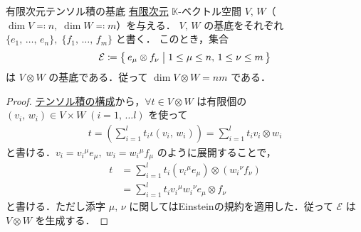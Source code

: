 \documentclass[rep_main]{subfiles}
\begin{document}
\begin{myprop}[label=prop:basis-tensor]{有限次元テンソル積の基底}
	\underline{有限次元} $\mathbb{K}$-ベクトル空間 $V,\, W$（$\dim V \eqqcolon n,\; \dim W \eqqcolon m$）を与える．
    $V,\, W$ の基底をそれぞれ $\{e_1,\, \dots,\, e_n\},\; \{f_1,\, \dots,\, f_m\}$ と書く．
	このとき，集合
	\begin{align}
		\mathcal{E} \coloneqq \bigl\{\, e_\mu \otimes f_\nu \bigm| 1 \le \mu \le n,\, 1 \le \nu \le m \,\bigr\} 
	\end{align}
	は $V \otimes W$ の基底である．従って $\dim V \otimes W = nm$ である．
\end{myprop}

\begin{proof}
	\hyperref[prop:tensor-vec]{テンソル積の構成}から，$\forall t \in V \otimes W$ は有限個の $(v_i,\, w_i) \in V \times W\; (i=1,\, \dots l)$ を使って
	\begin{align}
		t = \left(\sum_{i=1}^l t_{i} \iota(v_i,\, w_i)\right) = \sum_{i=1}^l t_i v_i \otimes w_i
	\end{align}
	と書ける．$v_i = v_i{}^\mu e_\mu,\; w_i = w_i{}^{\mu} f_\mu$ のように展開することで，
	\begin{align}
		t &= \sum_{i=1}^l t_i (v_i{}^\mu e_\mu) \otimes (w_i{}^\nu f_\nu) \\
		&= \sum_{i=1}^l t_i v_i{}^\mu w_i{}^\nu e_{\mu} \otimes f_\nu
	\end{align}
	と書ける．ただし添字 $\mu,\, \nu$ に関してはEinsteinの規約を適用した．従って $\mathcal{E}$ は $V \otimes W$ を生成する．


\end{proof}
\end{document}
